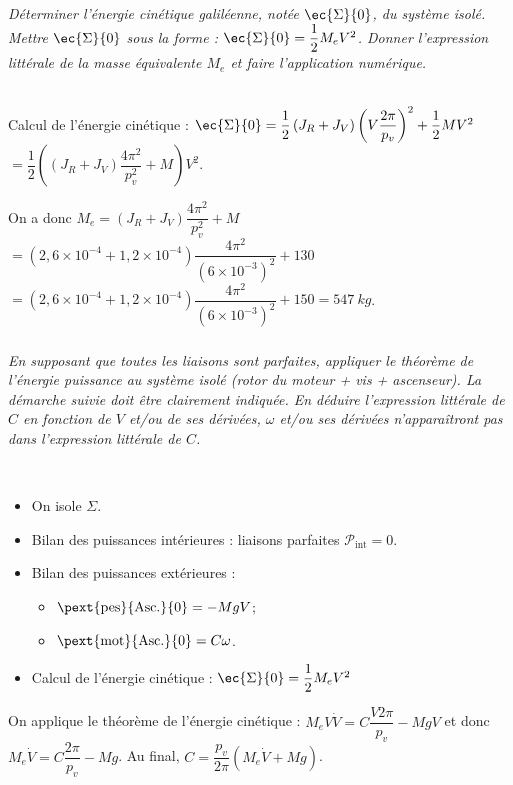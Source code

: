 \begin{multicols}{2}
\subparagraph{}\textit{Déterminer l’énergie cinétique galiléenne, notée $\ec{\Sigma}{0}$, du système isolé. Mettre $\ec{\Sigma}{0}$ sous la forme : $\ec{\Sigma}{0} = \dfrac{1}{2}M_eV^2$. Donner l’expression littérale de la masse équivalente $M_e$ et faire l’application numérique.}
\ifprof
\begin{corrige}~\\
Calcul de l'énergie cinétique : $\ec{\Sigma}{0} = \dfrac{1}{2}\left( J_R+J_V\right) \left(  V\dfrac{2\pi}{p_v}\right)^2+\dfrac{1}{2}MV^2$ $= \dfrac{1}{2}\left(\left( J_R+J_V\right) \dfrac{4\pi^2}{p_v^2} +M \right)V^2$.

On a donc $M_e = \left( J_R+J_V\right) \dfrac{4\pi^2}{p_v^2} +M$ $=\left( 2,6\times 10^{-4}+1,2\times 10^{-4}\right) \dfrac{4\pi^2}{\left( 6\times 10^{-3}\right)^2} +130$
$=\left( 2,6\times 10^{-4}+1,2\times 10^{-4}\right) \dfrac{4\pi^2}{\left( 6\times 10^{-3}\right)^2} +150 = \SI{547}{kg}$.
\end{corrige}
\else
\fi


\subparagraph{}\textit{En supposant que toutes les liaisons sont parfaites, appliquer le théorème de
l’énergie puissance au système isolé (rotor du moteur + vis + ascenseur). La
démarche suivie doit être clairement indiquée. En déduire l’expression littérale
de $C$ en fonction de $V$ et/ou de ses dérivées, $\omega$ et/ou ses dérivées n’apparaîtront
pas dans l’expression littérale de $C$.}
\ifprof
\begin{corrige}~\\
\begin{itemize}
\item On isole $\Sigma$. 
\item Bilan des puissances intérieures : liaisons parfaites $\mathcal{P}_{\text{int}} = 0$.
\item Bilan des puissances extérieures : 
\begin{itemize}
\item $\pext{\text{pes}}{\text{Asc.}}{0}=-MgV$;
\item $\pext{\text{mot}}{\text{Asc.}}{0}=C\omega$.
\end{itemize}
\item Calcul de l'énergie cinétique : $\ec{\Sigma}{0} = \dfrac{1}{2}M_eV^2$
\end{itemize}
On applique le théorème de l'énergie cinétique : $M_e V \dot{V} =C\dfrac{V2\pi}{p_v} - MgV$ et donc 
$M_e \dot{V} =C\dfrac{2\pi}{p_v} - Mg$. Au final, $C = \dfrac{p_v}{2\pi}\left(M_e \dot{V} +Mg\right) $.
\end{corrige}
\else
\fi



\end{multicols}
